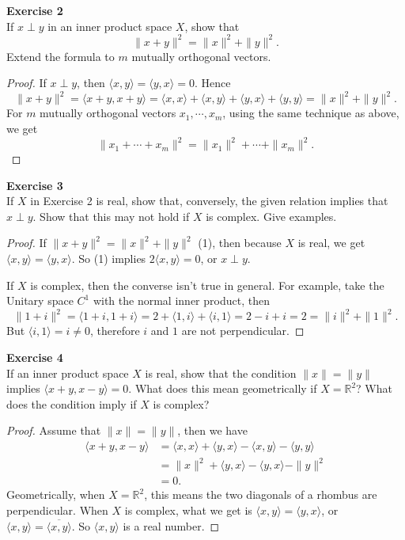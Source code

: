 \documentclass[12pt, a4paper]{article}
\theoremstyle{plain}
\newcommand{\R}{\mathbb{R}}
\newenvironment{exercise}[2][Exercise]
    { \begin{mdframed}[backgroundcolor=gray!20] \textbf{#1 #2} \\}
    {  \end{mdframed}}
\begin{document}
\begin{exercise}{2}
If $x\perp y$ in an inner product space $X$, show that 
\[
\|x+y\|^2 = \|x\|^2+\|y\|^2.
\]
Extend the formula to $m$ mutually orthogonal vectors.
\end{exercise}
	\begin{proof}
	If $x\perp y$, then $\langle{x,y}\rangle = \langle{y,x}\rangle = 0$. Hence
	\[
	\|x+y\|^2 = \langle{x+y,x+y}\rangle = \langle{x,x}\rangle +\langle{x,y}\rangle + \langle{y,x}\rangle +\langle{y,y}\rangle = \|x\|^2+\|y\|^2.
	\]
	For $m$ mutually orthogonal vectors $x_1,\cdots,x_m$, using the same technique as above, we get
	\[
	\|x_1+\cdots+x_m\|^2 = \|x_1\|^2+\cdots +\|x_m\|^2.
	\]
	\end{proof}

\begin{exercise}{3}
If $X$ in Exercise 2 is real, show that, conversely, the given relation implies that $x\perp y$. Show that this may not hold if $X$ is complex. Give examples.
\end{exercise}
	\begin{proof}
	If $\|x+y\|^2 = \|x\|^2+\|y\|^2$ (1), then because $X$ is real, we get $\langle{x,y}\rangle = \langle{y,x}\rangle$. So (1) implies $2\langle{x,y}\rangle =0$, or $x\perp y$. 
	
	If $X$ is complex, then the converse isn't true in general. For example, take the Unitary space $C^1$ with the normal inner product, then
	\[
	\|1+i\|^2 = \langle{1+i,1+i}\rangle = 2 + \langle{1,i}\rangle + \langle{i,1}\rangle = 2 -i+i = 2 = \|i\|^2+\|1\|^2.
	\]
	But $\langle{i,1}\rangle = i\neq 0$, therefore $i$ and $1$ are not perpendicular.
	\end{proof}
	
\begin{exercise}{4}
If an inner product space $X$ is real, show that the condition $\|x\| = \|y\|$ implies $\langle{x+y,x-y}\rangle=0$. What does this mean geometrically if $X=\R^2$? What does the condition imply if $X$ is complex?
\end{exercise}
	\begin{proof}
	Assume that $\|x\|=\|y\|$, then we have
	\begin{align*}
	\langle{x+y,x-y}\rangle &= \langle{x,x}\rangle +\langle{y,x}\rangle - \langle{x,y}\rangle -\langle{y,y}\rangle\\
	&= \|x\|^2 + \langle{y,x}\rangle - \langle{y,x}\rangle -\|y\|^2\\
	&=0.
	\end{align*}
	Geometrically, when $X=\R^2$, this means the two diagonals of a rhombus are perpendicular. When $X$ is complex, what we get is $\langle{x,y}\rangle = \langle{y,x}\rangle$, or $\langle{x,y}\rangle = \overline{\langle{x,y}\rangle}$. So $\langle{x,y}\rangle$ is a real number.
	\end{proof}
\end{document}
